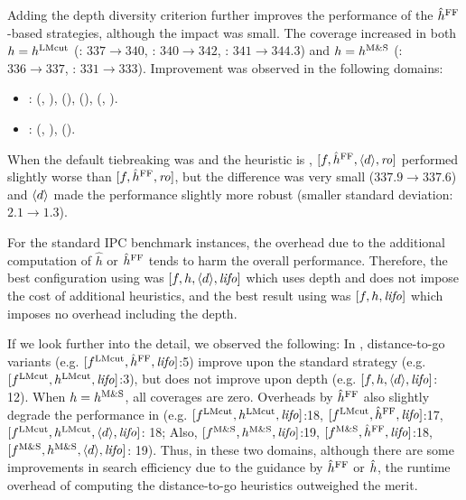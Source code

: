 Adding the depth diversity criterion further improves the performance of the $\hat{h}^{\text{FF}}$-based strategies,
 although the impact was small.
The coverage increased in both
 $h=h^\text{LMcut}$ (\fifo: $337\rightarrow 340$, \lifo: $340\rightarrow 342$, \ro: $341\rightarrow 344.3$) and
 $h=h^\text{M\&S}$ (\fifo: $336\rightarrow 337$, \lifo: $331\rightarrow 333$).
Improvement was observed in the following domains:
\begin{itemize}
 \item \textbf{\lmcut}:  (\lifo, \ro),  (\ro),  (\fifo),  (\fifo, \ro).
 \item \textbf{\mands}:  (\lifo, \ro),  (\fifo).
\end{itemize}
When the default tiebreaking was \ro and the heuristic is \mands, $[f,\hat{h}^{\text{FF}},{\left<d\right>},{\text{\textit{ro}}}]$ performed slightly worse than 
$[f,\hat{h}^{\text{FF}},{\text{\textit{ro}}}]$, but the difference was very small  ($337.9\rightarrow 337.6$) and ${\left<d\right>}$ made the performance slightly more robust (smaller standard deviation: $2.1\rightarrow 1.3$).

For the standard IPC benchmark instances, the overhead due to the additional computation of
$\hat{h}$ or $\hat{h}^{\text{FF}}$ tends to harm the overall performance.
Therefore, the best configuration using \lmcut was
$[f,h,{\left<d\right>},{\text{\textit{lifo}}}]$ which uses depth and does not impose the cost of
additional heuristics, and the best result using \mands
was $[f,h,{\text{\textit{lifo}}}]$ which imposes no overhead including the depth.

If we look further into the detail, we observed the following:
In , distance-to-go variants (e.g. $[f^\text{LMcut},\hat{h}^{\text{FF}},{\text{\textit{lifo}}}]$:5) improve upon the standard strategy (e.g. $[f^\text{LMcut},h^\text{LMcut},{\text{\textit{lifo}}}]$:3), but does not improve upon depth (e.g. $[f,h,{\left<d\right>},{\text{\textit{lifo}}}]$: 12). When $h=h^\text{M\&S}$, all coverages are zero. Overheads by $\hat{h}^{\text{FF}}$ also slightly degrade the performance in  (e.g. $[f^\text{LMcut},h^\text{LMcut},{\text{\textit{lifo}}}]$:18, $[f^\text{LMcut},\hat{h}^{\text{FF}},{\text{\textit{lifo}}}]$:17, $[f^\text{LMcut},h^\text{LMcut},{\left<d\right>},{\text{\textit{lifo}}}]$: 18; Also, $[f^\text{M\&S},h^\text{M\&S},{\text{\textit{lifo}}}]$:19, $[f^\text{M\&S},\hat{h}^{\text{FF}},{\text{\textit{lifo}}}]$:18, $[f^\text{M\&S},h^\text{M\&S},{\left<d\right>},{\text{\textit{lifo}}}]$: 19). Thus, in these two domains, although there are some improvements in search efficiency due to the guidance by $\hat{h}^{\text{FF}}$ or $\hat{h}$, the runtime overhead of computing the  distance-to-go heuristics outweighed the merit.
 
